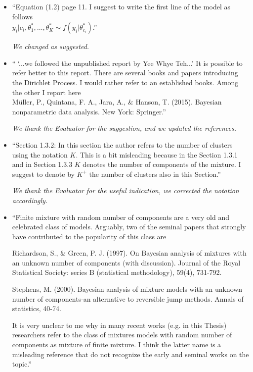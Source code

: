 \documentclass[11pt]{letter}
\begin{document}
\begin{itemize}
{\em 
	We thank the Evaluator for noticing this redundancy in the notation, the model specification was edited as suggested.
}
\vskip3mm

%
\item ``Equation (1.2) page 11.
I suggest to write the first line of the model as follows\\
$y_i|c_i,\theta^*_1,\dots,\theta^*_K \sim f(y_i|\theta^*_{c_i})$.''
\vskip1mm

{\em 
	We changed as suggested.
}
\vskip3mm

%
\item `` `...we followed the unpublished report by Yee Whye Teh...'
It is possible to refer better to this report. There are several books and papers introducing the Dirichlet Process. I would rather refer to an established books. Among the other I report here\\
M\"uller, P., Quintana, F. A., Jara, A., \& Hanson, T. (2015). Bayesian nonparametric data analysis. New York: Springer.''\vskip1mm

{\em 
	We thank the Evaluator for the suggestion, and we updated the references.
}
\vskip3mm

%
\item ``Section 1.3.2:
In this section the author refers to the number of clusters using the notation $K$. This is a bit misleading because in the Section 1.3.1 and in Section 1.3.3 $K$ denotes the number of components of the mixture. I suggest to denote by $K^+$ the number of clusters also in this Section.''\vskip1mm

{\em 
	We thank the Evaluator for the useful indication, we corrected the notation accordingly.
}
\vskip3mm

%
\item ``Finite mixture with random number of components are a very old and celebrated class of models. Arguably, two of the seminal papers that strongly have contributed to the popularity of this class are

Richardson, S., \& Green, P. J. (1997). On Bayesian analysis of mixtures with an unknown number of components (with discussion). Journal of the Royal Statistical Society: series B (statistical methodology), 59(4), 731-792.

Stephens, M. (2000). Bayesian analysis of mixture models with an unknown number of components-an
alternative to reversible jump methods. Annals of statistics, 40-74.

It is very unclear to me why in many recent works (e.g. in this Thesis) researchers refer to the class of mixtures models with random number of components as mixture of finite mixture. I think the latter name is a misleading reference that do not recognize the early and seminal works on the topic.''\vskip1mm


\end{itemize}
\end{document}
